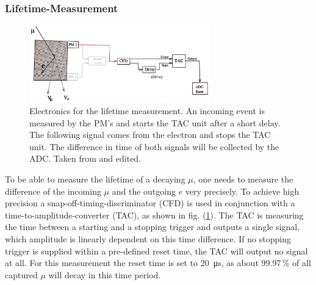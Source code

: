 \subsubsection{Lifetime-Measurement}
	
	\begin{figure}[ht]
		\centering
		\includegraphics[width=0.7\textwidth]{img/lebensdauer.jpg}
		\caption{Electronics for the lifetime measurement.
			An incoming event is measured by the PM's and starts the TAC unit after a short delay.
			The following signal comes from the electron and stops the TAC unit.
			The difference in time of both signals will be collected by the ADC.
			Taken from \cite{wwu} and edited.
		}
		\label{fig:electronics_lifetime}
	\end{figure}

	To be able to measure the lifetime of a decaying $\mu$, one needs to measure the difference of the incoming $\mu$ and the outgoing $e$ very precisely.
	To achieve high precision a snap-off-timing-discriminator (CFD) is used in conjunction with a time-to-amplitude-converter (TAC), as shown in fig. (\ref{fig:electronics_lifetime}).
	The TAC is measuring the time between a starting and a stopping trigger and outputs a single signal, which amplitude is linearly dependent on this time difference.
	If no stopping trigger is supplied within a pre-defined reset time, the TAC will output no signal at all.
	For this measurement the reset time is set to \SI{20}{\micro\second}, as about 99.97\,\% of all captured $\mu$ will decay in this time period.


